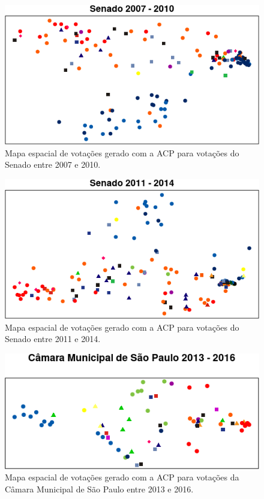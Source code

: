 \documentclass[
	article,			%
	12pt,				%
    twoside,			%
	a4paper,			%
	english,			%
	french,				%
	spanish,			%
	brazil,				%
	]{abntex2}
\begin{document}
\begin{figure}[h!]
  \centering
  \includegraphics[scale=0.9]{figs/sen2007-2010.png}
  \caption{Mapa espacial de votações gerado com a ACP para votações do Senado entre 2007 e 2010.}
  \label{fig:sen2007-2010}
\end{figure}

\begin{figure}[h!]
  \centering
  \includegraphics[scale=0.9]{figs/sen2011-2014.png}
  \caption{Mapa espacial de votações gerado com a ACP para votações do Senado entre 2011 e 2014.}
  \label{fig:sen2011-2014}
\end{figure}

\begin{figure}[h!]
  \centering
  \includegraphics[scale=0.9]{figs/cmsp2013-2016.png}
  \caption{Mapa espacial de votações gerado com a ACP para votações da Câmara Municipal de São Paulo entre 2013 e 2016.}
  \label{fig:cmsp2013-2016}
\end{figure}
\end{document}
